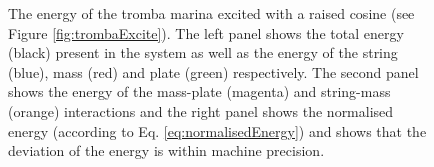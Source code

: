 \begin{figure}[h]
    \centering
      \caption{The energy of the tromba marina excited with a raised cosine (see Figure \ref{fig:trombaExcite}). The left panel shows the total energy (black) present in the system as well as the energy of the string (blue), mass (red) and plate (green) respectively. The second panel shows the energy of the mass-plate (magenta) and string-mass (orange) interactions and the right panel shows the normalised energy (according to Eq. \eqref{eq:normalisedEnergy}) and shows that the deviation of the energy is within machine precision. \label{fig:trombaEnergy}}
\end{figure}



